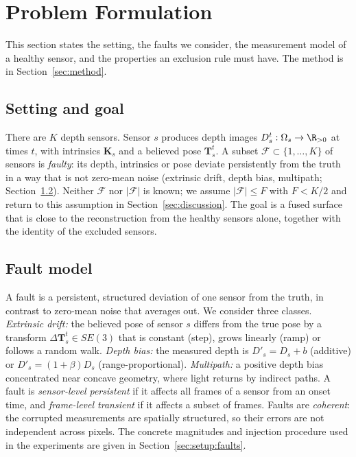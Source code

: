 \section{Problem Formulation}
\label{sec:formulation}

This section states the setting, the faults we consider, the measurement model
of a healthy sensor, and the properties an exclusion rule must have. The method
is in Section~\ref{sec:method}.

\subsection{Setting and goal}
\label{sec:form:setting}
There are $K$ depth sensors. Sensor $s$ produces depth images
$D_s^t:\Omega_s\to\R_{>0}$ at times $t$, with intrinsics $\mathbf{K}_s$ and a
believed pose $\mathbf{T}^{t}_{s}$. A subset $\mathcal{F}\subset\{1,\dots,K\}$ of
sensors is \emph{faulty}: its depth, intrinsics or pose deviate persistently
from the truth in a way that is not zero-mean noise (extrinsic drift, depth
bias, multipath; Section~\ref{sec:form:faults}). Neither $\mathcal{F}$ nor
$|\mathcal{F}|$ is known; we assume $|\mathcal{F}|\le F$ with $F<K/2$ and
return to this assumption in Section~\ref{sec:discussion}. The goal is a fused
surface that is close to the reconstruction from the healthy sensors alone,
together with the identity of the excluded sensors.

\subsection{Fault model}
\label{sec:form:faults}
A fault is a persistent, structured deviation of one sensor from the truth, in
contrast to zero-mean noise that averages out. We consider three classes.
\emph{Extrinsic drift:} the believed pose of sensor $s$ differs from the true pose
by a transform $\Delta\mathbf{T}_s^{t}\in SE(3)$ that is constant (step), grows
linearly (ramp) or follows a random walk. \emph{Depth bias:} the measured depth is
$D'_s=D_s+b$ (additive) or $D'_s=(1+\beta)D_s$ (range-proportional). \emph{Multipath:}
a positive depth bias concentrated near concave geometry, where light returns by
indirect paths. A fault is \emph{sensor-level persistent} if it affects all frames
of a sensor from an onset time, and \emph{frame-level transient} if it affects a
subset of frames. Faults are \emph{coherent}: the corrupted measurements are spatially
structured, so their errors are not independent across pixels. The concrete
magnitudes and injection procedure used in the experiments are given in
Section~\ref{sec:setup:faults}.

